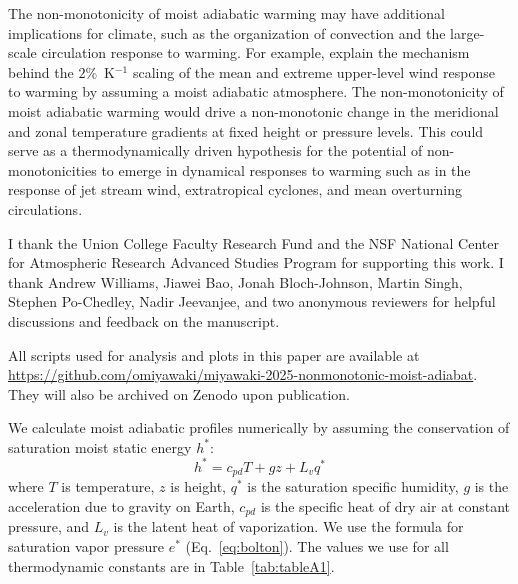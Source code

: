 \documentclass[draft,twocol]{ametsocV6.1}
\begin{document}
The non-monotonicity of moist adiabatic warming may have additional implications for climate, such as the organization of convection and the large-scale circulation response to warming. For example, \cite{shaw2025a}  explain the mechanism behind the $2\%$~K$^{-1}$ scaling of the mean and extreme upper-level wind response to warming by assuming a moist adiabatic atmosphere. The non-monotonicity of moist adiabatic warming would drive a non-monotonic change in the meridional and zonal temperature gradients at fixed height or pressure levels. This could serve as a thermodynamically driven hypothesis for the potential of non-monotonicities to emerge in dynamical responses to warming such as in the response of jet stream wind, extratropical cyclones, and mean overturning circulations.

\acknowledgments
I thank the Union College Faculty Research Fund and the NSF National Center for Atmospheric Research Advanced Studies Program for supporting this work. I thank Andrew Williams, Jiawei Bao, Jonah Bloch-Johnson, Martin Singh, Stephen Po-Chedley, Nadir Jeevanjee, and two anonymous reviewers for helpful discussions and feedback on the manuscript.

% 
%
\datastatement
All scripts used for analysis and plots in this paper are available at \url{https://github.com/omiyawaki/miyawaki-2025-nonmonotonic-moist-adiabat}. They will also be archived on Zenodo upon publication.



\appendix[A] 
\label{app:calculation}
We calculate moist adiabatic profiles numerically by assuming the conservation of saturation moist static energy $h^*$:
\begin{equation}
h^*=c_{pd} T+gz+L_v q^* \label{eq:mse}
\end{equation}
where $T$ is temperature, $z$ is height, $q^*$ is the saturation specific humidity, $g$ is the acceleration due to gravity on Earth, $c_{pd}$ is the specific heat of dry air at constant pressure, and $L_v$ is the latent heat of vaporization. We use the \cite{bolton1980} formula for saturation vapor pressure $e^*$ (Eq.~\ref{eq:bolton}). The values we use for all thermodynamic constants are in Table~\ref{tab:tableA1}. 
\end{document}

